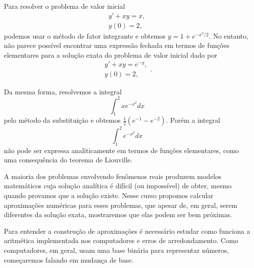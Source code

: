 Para resolver o problema de valor inicial
$$
\begin{array}{l}
y'+xy=x,\\
y(0)=2,
\end{array}
$$
podemos usar o método de fator integrante e obtemos $y=1+e^{-x^2/2}$. No entanto, não parece possível  encontrar uma expressão fechada em termos de funções elementares para a solução exata do problema de valor inicial dado por
$$
\begin{array}{l}
y'+xy=e^{-y},\\
y(0)=2,
\end{array}.
$$


Da mesma forma, resolvemos a integral
$$
\int_1^2xe^{-x^2}dx
$$
pelo método da substituição e obtemos $\frac{1}{2}(e^{-1}-e^{-2})$. Porém a integral
$$
\int_1^2 e^{-x^2} dx
$$
não pode ser expressa analiticamente em termos de funções elementares, como uma consequência do teorema de Liouville.

A maioria dos problemas envolvendo fenômenos reais produzem modelos matemáticos cuja solução analítica é difícil (ou impossível) de obter, mesmo quando provamos que a solução existe. Nesse curso propomos calcular aproximações numéricas para esses problemas, que apesar de, em geral, serem diferentes da solução exata, mostraremos que elas podem ser bem próximas.

Para entender a construção de aproximações é necessário estudar como funciona a aritmética implementada nos computadores e erros de arredondamento. Como computadores, em geral, usam uma base binária para representar números, começaremos falando em mudança de base.


%
